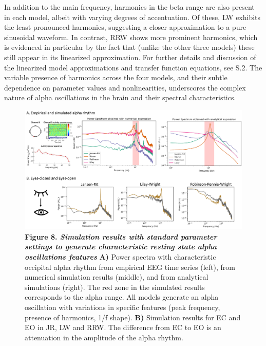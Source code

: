 \documentclass[12pt,twoside]{article}
\begin{document}
In addition to the main frequency, harmonics in the beta range are also present in each model, albeit with varying degrees of accentuation. Of these, LW exhibits the least pronounced harmonics, suggesting a closer approximation to a pure sinusoidal waveform. In contrast, RRW shows more prominent harmonics, which is evidenced in particular by the fact that (unlike the other three models) these still appear in its linearized approximation. For further details and discussion of the linearized model approximations and transfer function equations, see S.2. The variable presence of harmonics across the four models, and their subtle dependence on parameter values and nonlinearities, underscores the complex nature of alpha oscillations in the brain and their spectral characteristics.
\begin{figure}[H]
    \centering
    \includegraphics[scale=0.4]  {Images/Figure_alpha_2.png} %
    \caption*{\textbf{Figure 8.   \textit{Simulation results with standard parameter settings to generate characteristic resting state alpha oscillations features}} \textbf{A)} Power spectra with characteristic occipital alpha rhythm from empirical EEG time series (left), from numerical simulation results (middle), and from analytical simulations (right). The red zone in the simulated results corresponds to the alpha range. All models generate an alpha oscillation with variations in specific features (peak frequency, presence of harmonics, 1/f shape). \textbf{B)} Simulation results for EC and EO in JR, LW and RRW. The difference from EC to EO is an attenuation in the amplitude of the alpha rhythm. }
    \label{fig:Alpha_results}
\end{figure}
\vspace{-1cm} 
\end{document}
